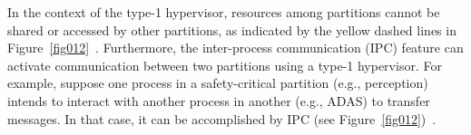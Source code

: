     In the context of the type-1 hypervisor, resources among partitions cannot be shared or accessed by other partitions, as indicated by the yellow dashed lines in Figure~\ref{fig012}~\cite{askaripoor2022architecture}.
    Furthermore, the inter-process communication (IPC) feature can activate communication between two partitions using a type-1 hypervisor. For example, suppose one process in a safety-critical partition (e.g., perception) intends to interact with another process in another (e.g., ADAS) to transfer messages. In that case, it can be accomplished by IPC (see Figure~\ref{fig012})~\cite{askaripoor2022architecture}.

  

    
    

